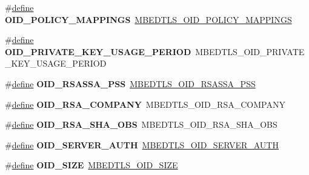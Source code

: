 \begin{DoxyCompactItemize}
\item 
\mbox{\label{compat-1_83_8h_a06bec752671e308c911efe42d4d1e34d}} 
\#\hyperlink{structdefine}{define} {\bfseries O\+I\+D\+\_\+\+P\+O\+L\+I\+C\+Y\+\_\+\+M\+A\+P\+P\+I\+N\+GS}~\hyperlink{oid_8h_a60cb6904e309c47c39d370beaf54007c}{M\+B\+E\+D\+T\+L\+S\+\_\+\+O\+I\+D\+\_\+\+P\+O\+L\+I\+C\+Y\+\_\+\+M\+A\+P\+P\+I\+N\+GS}
\item 
\mbox{\label{compat-1_83_8h_a970d989aeb2efe0725ee58f4cced13da}} 
\#\hyperlink{structdefine}{define} {\bfseries O\+I\+D\+\_\+\+P\+R\+I\+V\+A\+T\+E\+\_\+\+K\+E\+Y\+\_\+\+U\+S\+A\+G\+E\+\_\+\+P\+E\+R\+I\+OD}~M\+B\+E\+D\+T\+L\+S\+\_\+\+O\+I\+D\+\_\+\+P\+R\+I\+V\+A\+T\+E\+\_\+\+K\+E\+Y\+\_\+\+U\+S\+A\+G\+E\+\_\+\+P\+E\+R\+I\+OD
\item 
\mbox{\label{compat-1_83_8h_a5856e4fcda85ab1ebeb36380e36d7862}} 
\#\hyperlink{structdefine}{define} {\bfseries O\+I\+D\+\_\+\+R\+S\+A\+S\+S\+A\+\_\+\+P\+SS}~\hyperlink{oid_8h_aae3c0457fb260acc7811e4f54c7c407d}{M\+B\+E\+D\+T\+L\+S\+\_\+\+O\+I\+D\+\_\+\+R\+S\+A\+S\+S\+A\+\_\+\+P\+SS}
\item 
\mbox{\label{compat-1_83_8h_a51dfb66259013d79b8c6bbcd19a7bf24}} 
\#\hyperlink{structdefine}{define} {\bfseries O\+I\+D\+\_\+\+R\+S\+A\+\_\+\+C\+O\+M\+P\+A\+NY}~M\+B\+E\+D\+T\+L\+S\+\_\+\+O\+I\+D\+\_\+\+R\+S\+A\+\_\+\+C\+O\+M\+P\+A\+NY
\item 
\mbox{\label{compat-1_83_8h_a7e1d8297adb1372fb76dc3982443d315}} 
\#\hyperlink{structdefine}{define} {\bfseries O\+I\+D\+\_\+\+R\+S\+A\+\_\+\+S\+H\+A\+\_\+\+O\+BS}~M\+B\+E\+D\+T\+L\+S\+\_\+\+O\+I\+D\+\_\+\+R\+S\+A\+\_\+\+S\+H\+A\+\_\+\+O\+BS
\item 
\mbox{\label{compat-1_83_8h_afdd101bc31005e07fb0d9c1d62c6a959}} 
\#\hyperlink{structdefine}{define} {\bfseries O\+I\+D\+\_\+\+S\+E\+R\+V\+E\+R\+\_\+\+A\+U\+TH}~\hyperlink{oid_8h_ab47804622cec9a9e021efcd12e22b6bf}{M\+B\+E\+D\+T\+L\+S\+\_\+\+O\+I\+D\+\_\+\+S\+E\+R\+V\+E\+R\+\_\+\+A\+U\+TH}
\item 
\mbox{\label{compat-1_83_8h_af5cd733470c4214f9f38d0a1e042e590}} 
\#\hyperlink{structdefine}{define} {\bfseries O\+I\+D\+\_\+\+S\+I\+ZE}~\hyperlink{asn1_8h_ac2f2e00874ca486c912c33bb4f7bb16a}{M\+B\+E\+D\+T\+L\+S\+\_\+\+O\+I\+D\+\_\+\+S\+I\+ZE}

\end{DoxyCompactItemize}

